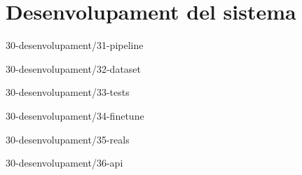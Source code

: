 \chapter{Desenvolupament del sistema}

{30-desenvolupament/31-pipeline}

{30-desenvolupament/32-dataset}

{30-desenvolupament/33-tests}

{30-desenvolupament/34-finetune}

{30-desenvolupament/35-reals}

{30-desenvolupament/36-api}




\begin{comment}
3 Desenvolupament del sistema
    3.1 Arquitectura del sistema (pipeline)
    3.2 Creació dataset sintètic
    [?] 3.3 Creació de tests
    3.4 Finetune sintètic
    3.5 Dataset i finetune amb dades reals
        3.5.1 Estadístiques descriptives
        3.5.2 Tendències i patrons
        3.5.3 Problemes i incidències comunes
        3.5.4 Anomalies i valors atípics
    3.6 Desplegament API
\end{comment}
